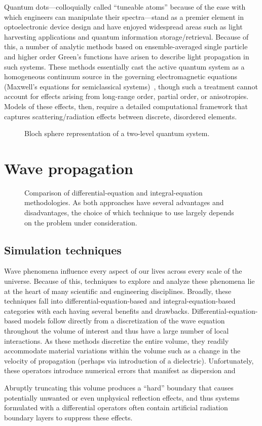 Quantum dots---colloquially called ``tuneable atoms'' because of the ease with which engineers can manipulate their spectra---stand as a premier element in optoelectronic device design and have enjoyed widespread areas such as light harvesting applications and quantum information storage/retrieval. 
Because of this, a number of analytic methods based on ensemble-averaged single particle and higher order Green's functions have arisen to describe light propagation in such systems.
These methods essentially cast the active quantum system as a homogeneous continuum source in the governing electromagnetic equations (Maxwell's equations for semiclassical systems)~\cite{Arecchi1965}, though such a treatment cannot account for effects arising from long-range order, partial order, or anisotropies. 
Models of these effects, then, require a detailed computational framework that captures scattering/radiation effects between discrete, disordered elements.

\begin{figure}
  \centering
  \caption{\label{eq:fig}Bloch sphere representation of a two-level quantum system.}
\end{figure}


\section{Wave propagation}

\begin{figure}
  \centering
  
  \caption{\label{fig:mindmap} Comparison of differential-equation and integral-equation methodologies.
    As both approaches have several advantages and disadvantages, the choice of which technique to use largely depends on the problem under consideration.
  }
\end{figure}

\subsection{Simulation techniques}

Wave phenomena influence every aspect of our lives across every scale of the universe.
Because of this, techniques to explore and analyze these phenomena lie at the heart of many scientific and engineering disciplines.
Broadly, these techniques fall into differential-equation-based and integral-equation-based categories with each having several benefits and drawbacks.
Differential-equation-based models follow directly from a discretization of the wave equation throughout the volume of interest and thus have a large number of local interactions.
As these methods discretize the entire volume, they readily accommodate material variations within the volume such as a change in the velocity of propagation (perhaps via introduction of a dielectric).
Unfortunately, these operators introduce numerical errors that manifest as dispersion and

Abruptly truncating this volume produces a ``hard'' boundary that causes potentially unwanted or even unphysical reflection effects, and thus systems formulated with a differential operators often contain artificial radiation boundary layers to suppress these effects.

